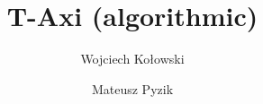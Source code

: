 \documentclass{beamer}
\title{T-Axi (algorithmic)}
\author
{
  Wojciech Kołowski\\
  \and
  Mateusz Pyzik\\
}
\date{}
\begin{document}
\frame{\titlepage}









\end{document}
